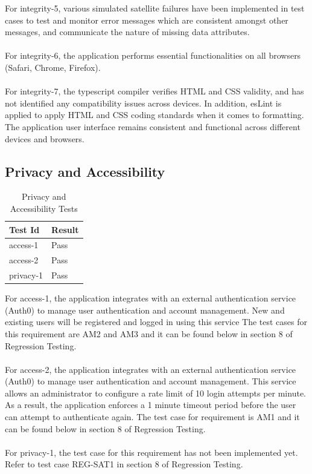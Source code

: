 \documentclass[12pt, titlepage]{article}
\begin{document}
For integrity-5, various simulated satellite failures have been implemented in test cases to test and monitor error messages which are consistent amongst other messages, and communicate the nature of missing data attributes.
\\ \\
For integrity-6, the application performs essential functionalities on all browsers (Safari, Chrome, Firefox).
\\ \\
For integrity-7, the typescript compiler verifies HTML and CSS validity, and has not identified any compatibility issues across devices. In addition, esLint is applied to apply HTML and CSS coding standards when it comes to formatting. The application user interface remains consistent and functional across different devices and browsers.
		
\subsection{Privacy and Accessibility}

\begin{center}
\begin{longtable}{|p{4cm} | p{4cm}| }
\caption{Privacy and Accessibility Tests}
\hline
\textbf{Test Id} & \textbf{Result} \\
\hline
access-1 & Pass \\
\hline
access-2 & Pass \\
\hline
privacy-1 & Pass \\
\hline

\end{longtable}
\end{center}

For access-1, the application integrates with an external authentication service (Auth0) to manage user authentication and account management. New and existing users will be registered and logged in using this service The test cases for this requirement are AM2 and AM3 and it can be found below in section 8 of Regression Testing.
\\ \\
For access-2, the application integrates with an external authentication service (Auth0) to manage user authentication and account management. This service allows an administrator to configure a rate limit of 10 login attempts per minute. As a result, the application enforces a 1 minute timeout period before the user can attempt to authenticate again. The test case for requirement is AM1 and it can be found below in section 8 of Regression Testing.
\\ \\
For privacy-1, the test case for this requirement has not been implemented yet. Refer to test case REG-SAT1 in section 8 of Regression Testing.
\end{document}
